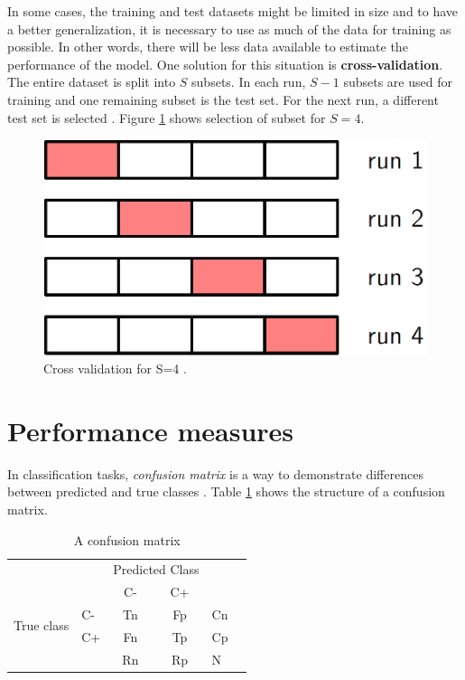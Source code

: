 In some cases, the training and test datasets might be limited in size and to have a better generalization, it is necessary to use as much of the data for training as possible. In other words, there will be less data available to estimate the performance of the model. One solution for this situation is \textbf{cross-validation}. The entire dataset is split into ${S}$ subsets. In each run, ${S - 1}$ subsets are used for training and one remaining subset is the test set. For the next run, a different test set is selected \cite{bishop2006pattern}. Figure \ref{fig:crossv} shows selection of subset for ${S = 4}$.

\begin{figure}
    \includegraphics[width=0.5\linewidth ]{figures/crossv.png}
    \centering
    \caption{Cross validation for S=4 \cite{bishop2006pattern}.}
    \label{fig:crossv}
\end{figure}


\section{Performance measures}
In classification tasks, \textit{confusion matrix} is a way to demonstrate differences between predicted and true classes \cite{Bradley1997}. Table \ref{tab:conf-mat} shows the structure of a confusion matrix.
\begin{table}[]
    \centering
    \begin{tabular}{llccll}
                                &    & \multicolumn{2}{l}{Predicted Class} &    &  \\ \cline{3-4}
                                &    & C-               & C+               &    &  \\ \hline
    \multirow{2}{*}{True class} & C- & Tn               & Fp               & Cn &  \\
                                & C+ & Fn               & Tp               & Cp &  \\
                                &    & Rn               & Rp               & N  &  \\ \hline
    \end{tabular}
    \caption{A confusion matrix}
    \label{tab:conf-mat}
\end{table}

